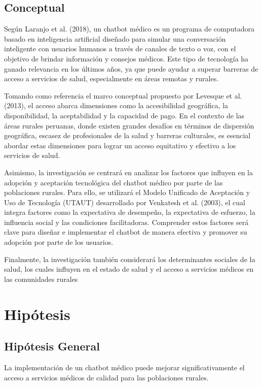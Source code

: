 \subsection{Conceptual}
Según Laranjo et al. (2018), un chatbot médico es un programa de computadora basado en inteligencia artificial diseñado para simular una conversación inteligente con usuarios humanos a través de canales de texto o voz, con el objetivo de brindar información y consejos médicos. Este tipo de tecnología ha ganado relevancia en los últimos años, ya que puede ayudar a superar barreras de acceso a servicios de salud, especialmente en áreas remotas y rurales.

Tomando como referencia el marco conceptual propuesto por Levesque et al. (2013), el acceso abarca dimensiones como la accesibilidad geográfica, la disponibilidad, la aceptabilidad y la capacidad de pago. En el contexto de las áreas rurales peruanas, donde existen grandes desafíos en términos de dispersión geográfica, escasez de profesionales de la salud y barreras culturales, es esencial abordar estas dimensiones para lograr un acceso equitativo y efectivo a los servicios de salud.

Asimismo, la investigación se centrará en analizar los factores que influyen en la adopción y aceptación tecnológica del chatbot médico por parte de las poblaciones rurales. Para ello, se utilizará el Modelo Unificado de Aceptación y Uso de Tecnología (UTAUT) desarrollado por Venkatesh et al. (2003), el cual integra factores como la expectativa de desempeño, la expectativa de esfuerzo, la influencia social y las condiciones facilitadoras. Comprender estos factores será clave para diseñar e implementar el chatbot de manera efectiva y promover su adopción por parte de los usuarios.

Finalmente, la investigación también considerará los determinantes sociales de la salud, los cuales influyen en el estado de salud y el acceso a servicios médicos en las comunidades rurales

\section{Hipótesis}

\subsection{Hipótesis General}
\newcommand{\HipotesisGeneral}{
La implementación de un chatbot médico puede mejorar significativamente el acceso a servicios médicos de calidad para las poblaciones rurales.
}
\HipotesisGeneral
